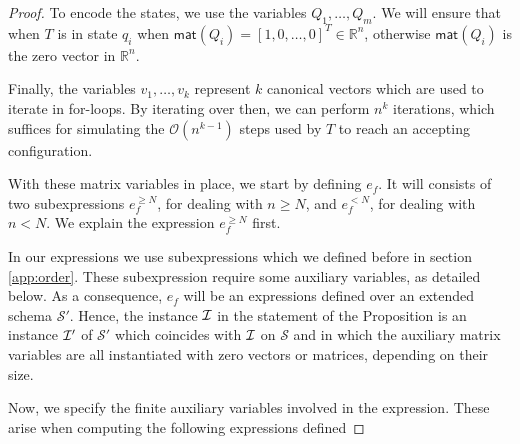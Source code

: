 \begin{proof}
To encode the states, we use the variables $Q_1,\ldots,Q_m$. We will ensure that when $T$ is in state 
$q_i$ when
 $\mathsf{mat}(Q_i)=[1,0,\ldots,0]^T\in\mathbb{R}^n$, otherwise $\mathsf{mat}(Q_i)$ is the zero 
 vector in $\mathbb{R}^n$.	

Finally, the variables $v_1,\ldots,v_{k}$ represent $k$ canonical vectors  which are used to iterate 
in for-loops. By iterating over then, we can perform $n^{k}$ iterations, 
which suffices for simulating the $\mathcal{O}(n^{k-1})$ steps used by $T$ to reach an accepting configuration. 

With these matrix variables in place, we start by defining $e_f$. It will consists of two subexpressions
$e_f^{\geq N}$, for dealing with $n\geq N$, and $e_f^{<N}$, for dealing with $n<N$. We explain the expression
$e_f^{\geq N}$ first.



In our  expressions we use subexpressions which we defined before in section \ref{app:order}. These subexpression 
require some auxiliary variables, as detailed below. As a consequence, $e_f$ will be an expressions 
defined over an extended schema $\mathcal{S}'$. Hence, the instance $\mathcal{I}$ in the statement of the Proposition 
is  an instance $\mathcal{I}'$ of $\mathcal{S}'$ which
coincides with $\mathcal{I}$ on $\mathcal{S}$ and in which the auxiliary matrix variables are all instantiated with 
zero vectors or matrices, depending on their size.

Now, we specify the finite auxiliary variables involved in the \langfor expression. These arise
when computing the following \langfor expressions defined 


\end{proof}

